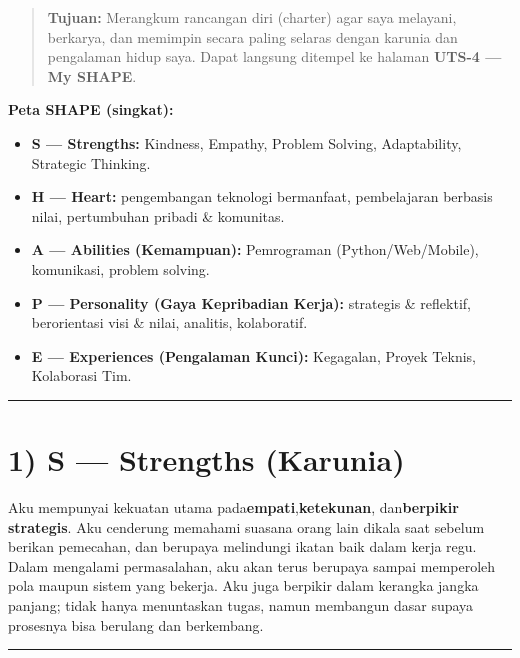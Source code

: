 \documentclass[
  letterpaper,
  DIV=11,
  numbers=noendperiod]{scrreprt}
\providecommand{\tightlist}{%
  \setlength{\itemsep}{0pt}\setlength{\parskip}{0pt}}
\begin{document}
\begin{quote}
\textbf{Tujuan:} Merangkum rancangan diri (charter) agar saya melayani,
berkarya, dan memimpin secara paling selaras dengan karunia dan
pengalaman hidup saya. Dapat langsung ditempel ke halaman \textbf{UTS-4
--- My SHAPE}.
\end{quote}

\textbf{Peta SHAPE (singkat):}

\begin{itemize}
\tightlist
\item
  \textbf{S --- Strengths:} Kindness, Empathy, Problem Solving,
  Adaptability, Strategic Thinking.\\
\item
  \textbf{H --- Heart:} pengembangan teknologi bermanfaat, pembelajaran
  berbasis nilai, pertumbuhan pribadi \& komunitas.\\
\item
  \textbf{A --- Abilities (Kemampuan):} Pemrograman (Python/Web/Mobile),
  komunikasi, problem solving.\\
\item
  \textbf{P --- Personality (Gaya Kepribadian Kerja):} strategis \&
  reflektif, berorientasi visi \& nilai, analitis, kolaboratif.\\
\item
  \textbf{E --- Experiences (Pengalaman Kunci):} Kegagalan, Proyek
  Teknis, Kolaborasi Tim.
\end{itemize}

\begin{center}\rule{0.5\linewidth}{0.5pt}\end{center}

\section{1) S --- Strengths (Karunia)}\label{s-strengths-karunia}

Aku mempunyai kekuatan utama pada\textbf{empati},\textbf{ketekunan},
dan\textbf{berpikir strategis}. Aku cenderung memahami suasana orang
lain dikala saat sebelum berikan pemecahan, dan berupaya melindungi
ikatan baik dalam kerja regu. Dalam mengalami permasalahan, aku akan
terus berupaya sampai memperoleh pola maupun sistem yang bekerja. Aku
juga berpikir dalam kerangka jangka panjang; tidak hanya menuntaskan
tugas, namun membangun dasar supaya prosesnya bisa berulang dan
berkembang.

\begin{center}\rule{0.5\linewidth}{0.5pt}\end{center}
\end{document}
